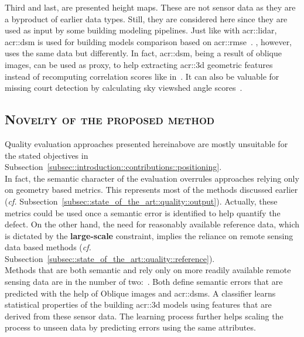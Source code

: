             Third and last, are presented height maps.
            These are not sensor data as they are a byproduct of earlier data types.
            Still, they are considered here since they are used as input by some building modeling pipelines.
            Just like with \gls{acr::lidar}, \gls{acr::dsm} is used for building models comparison based on \gls{acr::rmse}~\parencite{zeng2018neural}.
            \textcite{michelin2013quality}, however, uses the same data but differently.
            In fact, \gls{acr::dsm}, being a result of oblique images, can be used as proxy, to help extracting \gls{acr::3d} geometric features instead of recomputing correlation scores like in~\parencite{boudet2006supervised}.
            It can also be valuable for missing court detection by calculating sky viewshed angle scores~\parencite{michelin2013quality}.

    \subsection{\textsc{Novelty of the proposed method}}
        \label{subsec::state_of_the_art::quality::novelty}
        Quality evaluation approaches presented hereinabove are mostly unsuitable for the stated objectives in Subsection~\ref{subsec::introduction::contributions::positioning}.\\

        In fact, the semantic character of the evaluation overrules approaches relying only on geometry based metrics.
        This represents most of the methods discussed earlier (\textit{cf.} Subsection~\ref{subsec::state_of_the_art::quality::output}).
        Actually, these metrics could be used once a semantic error is identified to help quantify the defect.
        On the other hand, the need for reasonably available reference data, which is dictated by the \textbf{large-scale} constraint, implies the reliance on remote sensing data based methods (\textit{cf.} Subsection~\ref{subsec::state_of_the_art::quality::reference}).\\

        Methods that are both semantic and rely only on more readily available remote sensing data are in the number of two:~\parencite{boudet2006supervised,michelin2013quality}.
        Both define semantic errors that are predicted with the help of Oblique images and \glspl{acr::dsm}.
        A classifier learns statistical properties of the building \gls{acr::3d} models using features that are derived from these sensor data.
        The learning process further helps scaling the process to unseen data by predicting errors using the same attributes.\\


